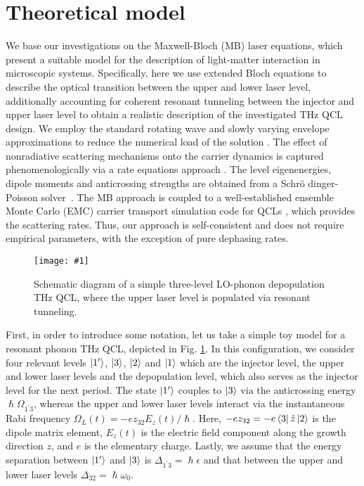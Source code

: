 \documentclass[10pt]{article}
\newcommand{\includegraphicsXS}[1]{\texttt{[image: \#1]}}
\begin{document}
	\section{Theoretical model}
	\label{sec:thmodel}
	We base our investigations on the Maxwell-Bloch (MB) laser equations, which present a suitable 
	model for the description of light-matter interaction in microscopic systems.
	Specifically, here we use extended Bloch equations to describe the optical transition
	between the upper and lower laser level, additionally accounting for coherent
	resonant tunneling between the injector and upper laser level to obtain a
	realistic description of the investigated THz QCL design. We employ the
	standard rotating wave and slowly varying envelope approximations to reduce
	the numerical load of the solution \cite{boyd2003nonlinear,wang2007coherent, gordon2008multimode,gkortsas2010dynamics}.
	The effect of nonradiative scattering mechanisms onto the carrier dynamics
	is captured phenomenologically via a rate equations approach
	\cite{wang2015active,jirauschek2014modeling,iotti2005microscopic}. The level eigenenergies, dipole
	moments and anticrossing strengths are obtained from a Schr{\"{o}}%
	dinger-Poisson solver\ \cite{2009IJQE451059J}. The MB approach is coupled
	to a well-established ensemble Monte Carlo (EMC) carrier transport simulation
	code for QCLs
	\cite{jirauschek2007comparative,jirauschek2009monte,jirauschek2010monte, jirauschek2010monte_2},
	which provides the scattering rates. Thus, our approach is self-consistent and
	does not require empirical parameters, with the exception of pure dephasing
	rates. 
			
	\begin{figure}[h!]
		\centering\includegraphicsXS{TOYMODEL.eps}\caption{Schematic
			diagram of a simple three-level LO-phonon depopulation THz QCL, where the
			upper laser level is populated via resonant tunneling.}%
		\label{fig:img01}%
	\end{figure}
	
	First, in order to introduce some notation, let us take a simple
	toy model for a resonant phonon THz QCL, depicted in Fig. \ref{fig:img01}. In this
	configuration, we consider four relevant levels $\Ket{1'}$, $\Ket{3}$, $\Ket{2}$ and
	$\Ket{1}$ which are the injector level, the upper and lower laser levels and
	the depopulation level, which also serves as the injector level for the next
	period. The state $\Ket{1'}$ couples to $\Ket{3}$ via the anticrossing energy
	$\hslash\Omega_{1^{\prime}3}$, whereas the upper and lower laser levels interact
	via the instantaneous Rabi frequency $\Omega_{L}(t)=-ez_{32}E_{z}(t)/\hslash$.
	Here, $-ez_{32}=-e\Bra{3}\hat{z}\Ket{2}$ is the dipole matrix element,
	$E_{z}(t)$ is the electric field component along the growth direction $z$, and
	$e$ is the elementary charge. Lastly, we assume that the energy separation
	between $\Ket{1'}$ and $\Ket{3}$ is $\Delta_{1^{\prime}3}=\hslash\epsilon$ and
	that between the upper and lower laser levels $\Delta_{32}=\hslash\omega_{0}$.
		
\end{document}
